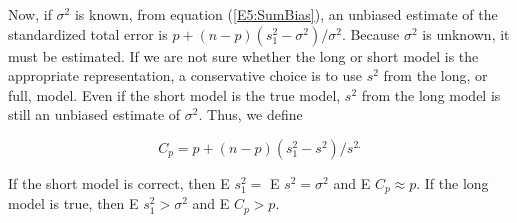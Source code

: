 Now, if $\sigma ^{2}$ is known, from equation (\ref{E5:SumBias}), an
unbiased estimate of the standardized total error is $
p+(n-p)(s_{1}^{2}-\sigma ^{2})/\sigma ^{2}.$ Because $\sigma ^{2}$
is unknown, it must be estimated. If we are not sure whether the
long or short model is the appropriate representation, a
conservative choice is to use $s^{2}$ from the long, or full, model.
Even if the short model is the true model, $s^{2}$ from the long
model is still an unbiased estimate of $\sigma ^{2}$. Thus, we
define

\begin{center}
\[
C_{p}=p+(n-p)(s_{1}^{2}-s^{2})/s^{2.}
\]
\end{center}

If the short model is correct, then E $s_{1}^{2}=$ E $s^{2}=\sigma
^{2}$ and E $C_{p}\approx p$. If the long model is true, then E
$s_{1}^{2}>\sigma ^{2}$ and E $C_{p}>p$.

